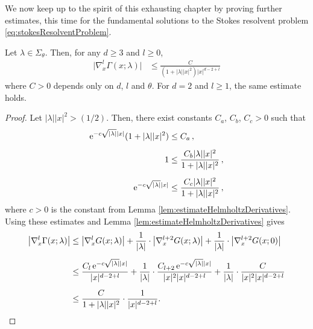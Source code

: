   We now keep up to the spirit of this exhausting chapter by proving further estimates, this time for the fundamental solutions to the Stokes resolvent problem \eqref{eq:stokesResolventProblem}.

\begin{thm}
  \label{thm:fundamentalMatrixEstimate}
  Let $\lambda \in \Sigma_\theta$.
  Then, for any $d \geq 3$ and $l \geq 0$,
  \begin{align}
    \label{eq:fundamentalMatrixEstimate}
    \big| \nabla_x^l \Gamma(x; \lambda) \big| &\leq \frac{C}{(1 + |\lambda||x|^2) |x|^{d - 2 + l}} 
  \end{align}
    where $C > 0$ depends only on $d$, $l$ and $\theta$. For $d = 2$ and $l \geq 1$, the same estimate holds.
\end{thm}

  \begin{proof}
    Let $|\lambda| |x|^2 > (1/2)$. 
    Then, there exist constants $C_a$, $C_b$, $C_c > 0$ such that
    \begin{align*}
      \mathrm{e}^{-c \sqrt{|\lambda|} |x|} ( 1 + |\lambda| |x|^2) &\leq C_a\,, \\[0.5em]
      1 &\leq \frac{C_b |\lambda| |x|^2}{1 + |\lambda| |x|^2}\,, \\[0.5em]
      \mathrm{e}^{-c \sqrt{|\lambda|} |x|} &\leq \frac{ C_c |\lambda| |x|^2}{1 + |\lambda| |x|^2}\,,
    \end{align*}
    where $c > 0$ is the constant from Lemma \ref{lem:estimateHelmholtzDerivatives}.
    Using these estimates and Lemma \ref{lem:estimateHelmholtzDerivatives} gives
    \begin{align*}
      \big|\nabla_x^l \Gamma(x; \lambda) \big|
      &\leq \big|\nabla_x^l G(x; \lambda)\big| + \frac{1}{|\lambda|}\cdot \big|\nabla_x^{l + 2} G(x; \lambda) \big| + \frac{1}{|\lambda|} \cdot \big|\nabla_x^{l + 2} G(x; 0)\big| \\[0.5em]
      &\leq\frac{C_l\, \mathrm{e}^{-c \sqrt{|\lambda|} |x|}}{|x|^{d - 2 + l}} + \frac{1}{|\lambda|} \cdot \frac{C_{l + 2}\, \mathrm{e}^{-c \sqrt{|\lambda|} |x|}}{|x|^2 |x|^{d - 2 + l}} + \frac{1}{|\lambda|} \cdot \frac{C}{|x|^2 |x|^{d - 2 + l}} \\[0.5em]
    &\leq \frac{C}{1 + |\lambda| |x|^2} \cdot \frac{1}{|x|^{d - 2 + l}}.
    \end{align*}

\end{proof}
